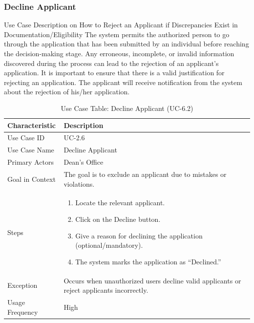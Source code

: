 \subsubsection{Decline Applicant}

Use Case Description on How to Reject an Applicant if Discrepancies Exist in Documentation/Eligibility
The system permits the authorized person to go through the application that has been submitted by an individual before reaching the decision-making stage.
Any erroneous, incomplete, or invalid information discovered during the process can lead to the rejection of an applicant’s application.
It is important to ensure that there is a valid justification for rejecting an application. 
The applicant will receive notification from the system about the rejection of his/her application.

\begin{table}[H]
    \centering
    \small
    \renewcommand{\arraystretch}{1.4}
    \caption{Use Case Table: Decline Applicant (UC-6.2)}
    \label{tab:dean_decline}
    
    \begin{tabularx}{\textwidth}{|l|X|}
        \hline
        \rowcolor[gray]{0.9} {Characteristic} & {Description} \\ \hline
        Use Case ID & UC-2.6 \\ \hline
        Use Case Name & Decline Applicant \\ \hline
        Primary Actors & Dean’s Office \\ \hline
        Goal in Context & The goal is to exclude an applicant due to mistakes or violations. \\ \hline
        Steps & 
        \begin{enumerate}[nosep, leftmargin=*]
            \item Locate the relevant applicant.
            \item Click on the Decline button.
            \item Give a reason for declining the application (optional/mandatory).
            \item The system marks the application as “Declined.”
        \end{enumerate} \\ \hline
        Exception & Occurs when unauthorized users decline valid applicants or reject applicants incorrectly. \\ \hline
        Usage Frequency & High \\ \hline
    \end{tabularx}
\end{table}
\FloatBarrier